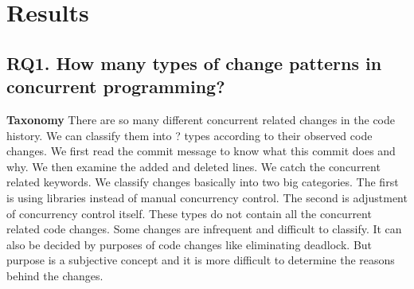 \section{Results}
\label{sec:result}
\subsection{RQ1. How many types of change patterns in concurrent programming?}
\label{sec:result:pattern}
\textbf{Taxonomy} There are so many different concurrent related changes in the code history. We can classify them into ? types according to their observed code changes. We first read the commit message to know what this commit does and why. We then examine the added and deleted lines. We catch the concurrent related keywords. We classify changes basically into two big categories. The first is using libraries instead of manual concurrency control. The second is adjustment of concurrency control itself. These types do not contain all the concurrent related code changes. Some changes are infrequent and difficult to classify. It can also be decided by purposes of code changes like eliminating deadlock. But purpose is a subjective concept and it is more difficult to determine the reasons behind the changes.


